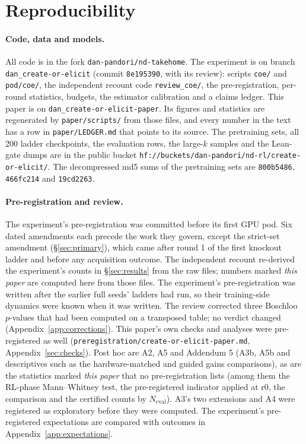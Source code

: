 \section{Reproducibility}
\label{sec:repro}

\paragraph{Code, data and models.} All code is in the fork \texttt{dan-pandori/nd-takehome}. The experiment is on branch
\texttt{dan\_create-or-elicit} (commit \texttt{8e195390}, with its review): scripts \texttt{coe/} and \texttt{pod/coe/},
the independent recount code \texttt{review\_coe/}, the pre-registration, per-round statistics, budgets, the estimator
calibration and a claims ledger. This paper is on \texttt{dan\_create-or-elicit-paper}. Its figures and statistics are
regenerated by \texttt{paper/scripts/} from those files, and every number in the text has a row in
\texttt{paper/LEDGER.md} that points to its source. The pretraining sets, all 200 ladder checkpoints, the evaluation rows,
the large-$k$ samples and the Lean-gate dumps are in the public bucket
\texttt{hf://buckets/dan-pandori/nd-rl/create-or-elicit/}. The decompressed md5 sums of the pretraining sets are \KT{}
\texttt{800b5486}, \KTko{} \texttt{466fc214} and \KTdose{} \texttt{19cd2263}.

\paragraph{Pre-registration and review.} The experiment's pre-registration was committed before its first GPU pod. Six
dated amendments each precede the work they govern, except the strict-set amendment (\S\ref{sec:primary}), which came
after round 1 of the first knockout ladder and before any acquisition outcome. The independent recount re-derived the experiment's
counts in \S\ref{sec:results} from the raw files; numbers marked \emph{this paper} are computed here from those files.
The experiment's pre-registration was written after the earlier full seeds' ladders had run, so their training-side
dynamics were known when it was written. The review corrected three Boschloo $p$-values that had been computed on a
transposed table; no verdict changed (Appendix~\ref{app:corrections}). This paper's own checks and analyses were
pre-registered as well (\texttt{preregistration/create-or-elicit-paper.md}, Appendix~\ref{sec:checks}). \rv{} Post hoc
are A2, A5 and Addendum 5 (A3b, A5b and descriptives such as the hardware-matched and guided gains comparisons), as are
the statistics marked \emph{this paper} that no pre-registration lists (among them the RL-phase Mann--Whitney test, the
pre-registered indicator applied at r0, the \dcov{} comparison and the certified counts by $N_{\mathrm{eval}}$). A3's two extensions and A4 were
registered as exploratory before they were computed. The experiment's pre-registered expectations are compared with outcomes in
Appendix~\ref{app:expectations}.


